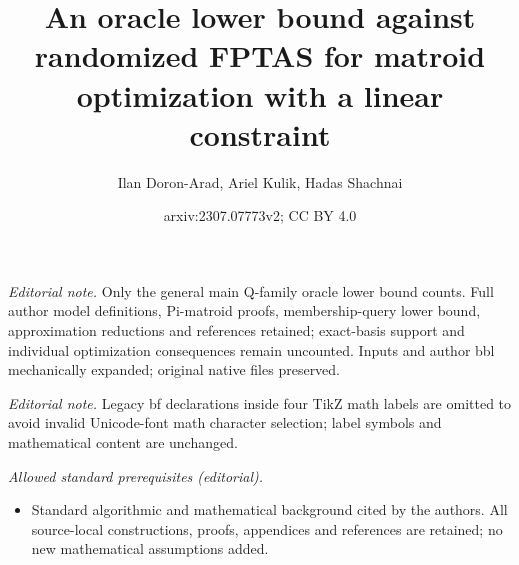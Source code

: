 \documentclass[11pt,letter]{article}
\title{An oracle lower bound against randomized FPTAS for matroid optimization with a linear constraint}
\author{Ilan Doron-Arad, Ariel Kulik, Hadas Shachnai}
\date{arxiv:2307.07773v2; CC BY 4.0}
\begin{document}
\maketitle
\noindent\textit{Editorial note.} Only the general main Q-family oracle lower bound counts. Full author model definitions, Pi-matroid proofs, membership-query lower bound, approximation reductions and references retained; exact-basis support and individual optimization consequences remain uncounted. Inputs and author bbl mechanically expanded; original native files preserved.\par\medskip
\noindent\textit{Editorial note.} Legacy bf declarations inside four TikZ math labels are omitted to avoid invalid Unicode-font math character selection; label symbols and mathematical content are unchanged.\par\medskip
\noindent\textit{Allowed standard prerequisites (editorial).}\begin{itemize}
\item Standard algorithmic and mathematical background cited by the authors. All source-local constructions, proofs, appendices and references are retained; no new mathematical assumptions added.
\end{itemize}\medskip
		\thispagestyle{empty}
		
\end{document}
